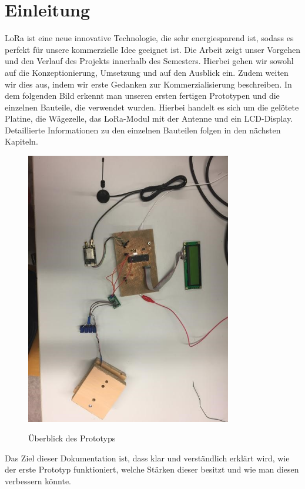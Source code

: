 





\thispagestyle{plain}
\section*{Einleitung}
LoRa ist eine neue innovative Technologie, die sehr energiesparend ist, sodass es perfekt für unsere kommerzielle Idee geeignet ist. 
Die Arbeit zeigt unser Vorgehen und den Verlauf des Projekts innerhalb des Semesters. Hierbei gehen wir sowohl auf die Konzeptionierung, Umsetzung und auf den Ausblick ein. Zudem weiten wir dies aus, indem wir erste Gedanken zur Kommerzialisierung beschreiben. 
In dem folgenden Bild erkennt man unseren ersten fertigen Prototypen und die einzelnen Bauteile, die verwendet wurden. Hierbei handelt es sich um die gelötete Platine, die Wägezelle, das LoRa-Modul mit der Antenne und ein LCD-Display. Detaillierte Informationen zu den einzelnen Bauteilen folgen in den nächsten Kapiteln.
\begin{figure}[H]
    \center
    \includegraphics[width=9cm]{Bilder/einleitung.jpg}\\
    \caption{Überblick des Prototyps}
    \label{fig:Einleitung}
\end{figure}
Das Ziel dieser Dokumentation ist, dass klar und verständlich erklärt wird, wie der erste Prototyp funktioniert, welche Stärken dieser besitzt und wie man diesen verbessern könnte. 
\newpage

